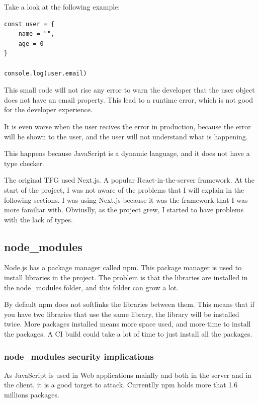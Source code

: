 \documentclass[12pt, letterpaper]{article}
\begin{document}
\begin{multicols}{2}
    Take a look at the following example:
    \begin{lstlisting}
const user = {
    name = "",
    age = 0
}

console.log(user.email)
    \end{lstlisting}

    This small code will not rise any error to warn the developer that the user object does not have an email property. This lead to a runtime error, which is not good for the developer experience.

    It is even worse when the user recives the error in production, because the error will be shown to the user, and the user will not understand what is happening.

    This happens because JavaScript is a dynamic language, and it does not have a type checker.

    The original TFG used Next.js. A popular React-in-the-server framework. At the start of the project, I was not aware of the problems that I will explain in the following sections. I was using Next.js because it was the framework that I was more familiar with. Obviuslly, as the project grew, I started to have problems with the lack of types.

    \subsection{node\_modules}

    Node.js has a package manager called npm. This package manager is used to install libraries in the project. The problem is that the libraries are installed in the node\_modules folder, and this folder can grow a lot.

    By default npm does not softlinks the libraries between them. This means that if you have two libraries that use the same library, the library will be installed twice. More packages installed means more space used, and more time to install the packages. A CI build could take a lot of time to just install all the packages.

    \subsubsection{node\_modules security implications}

    As JavaScript is used in Web applications mainlly and both in the server and in the client, it is a good target to attack. Currentlly npm holds more that 1.6 millions packages.


\end{multicols}
\end{document}
